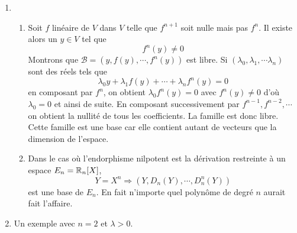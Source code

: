 \begin{enumerate}
\begin{enumerate}
       \item D'apr{\`e}s 1.a., lorsqu'il existe un entier $n$ et un $g_n\in \mathcal{L}(E_n)$ vérifiant la relation, tous les sous-espaces $E_p$ avec $p \in      \llbracket 0,n \rrbracket$ sont stables par $g_n$. D'après 1.b., lorsqu'il existe un $g$ dans $\mathcal{L}(E)$ vérifiant la condition, tous les sous-espaces $E_p$ avec $p$ entier sont stables par $g$.\newline
       Dans les deux cas, $E_0$ est stable donc $\lambda \geq 0$. Ainsi, lorsque $\lambda<0$, il n'existe pas d'application $g$ v{\'e}rifiant la condition {\'e}tudi{\'e}e, ni dans $\mathcal{L}(E)$, ni dans un $\mathcal{L}(E_n)$.
     \end{enumerate}

  \item
     \begin{enumerate}
\item Soit $f$ lin{\'e}aire de $V$ dans $V$ telle que $f^{n+1}$ soit nulle mais pas $f^n$. Il existe alors un $y\in V$ tel que
\begin{displaymath}
f^n(y)\neq 0  
\end{displaymath}
Montrons que $\mathcal{B}=(y,f(y),\cdots,f^n(y))$ est libre.\newline
Si $(\lambda_{0},\lambda_{1},\cdots\lambda_{n})$ sont des r{\'e}els tels que
 \begin{displaymath}
\lambda_{0}y+\lambda_{1}f(y)+\cdots+\lambda_{n}f^n(y)=0   
 \end{displaymath}
en composant par $f^n$, on obtient $\lambda_{0}f^n(y)=0$ avec $f^n(y)\neq 0$ d'o{\`u} $\lambda_{0}=0$ et ainsi de suite. En composant successivement par $f^{n-1},f^{n-2},\cdots$ on obtient la nullit{\'e} de tous les coefficients. La famille est donc libre.\newline
Cette famille est une base car elle contient autant de vecteurs que la dimension de l'espace.
       
\item Dans le cas où l'endorphisme nilpotent est la dérivation restreinte à un espace $E_n = \mathbb{R}_n[X]$, 
\begin{displaymath}
  Y = X^n \Rightarrow \left( Y,D_n(Y),\cdots,D_n^n(Y)\right) 
\end{displaymath}
est une base de $E_n$. En fait n'importe quel polynôme de degré $n$ aurait fait l'affaire.
     \end{enumerate}

  \item Un exemple avec $n=2$ et $\lambda >0$.


\end{enumerate}
